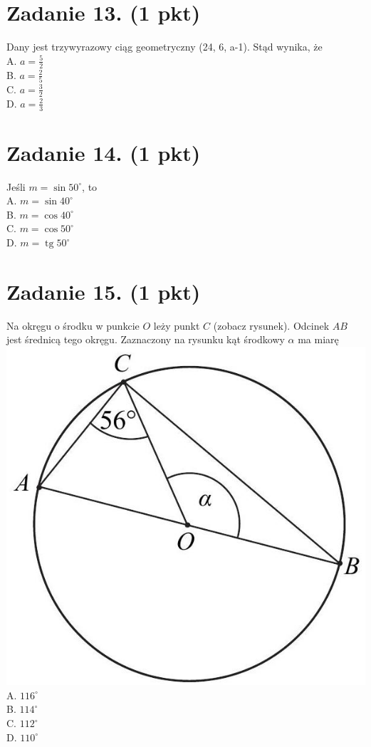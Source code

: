 \documentclass[10pt]{article}
\begin{document}
\section*{Zadanie 13. (1 pkt)}
Dany jest trzywyrazowy ciąg geometryczny (24, 6, a-1). Stąd wynika, że\\
A. \(a=\frac{5}{2}\)\\
B. \(a=\frac{2}{5}\)\\
C. \(a=\frac{3}{2}\)\\
D. \(a=\frac{2}{3}\)

\section*{Zadanie 14. (1 pkt)}
Jeśli \(m=\sin 50^{\circ}\), to\\
A. \(m=\sin 40^{\circ}\)\\
B. \(m=\cos 40^{\circ}\)\\
C. \(m=\cos 50^{\circ}\)\\
D. \(m=\operatorname{tg} 50^{\circ}\)

\section*{Zadanie 15. (1 pkt)}
Na okręgu o środku w punkcie \(O\) leży punkt \(C\) (zobacz rysunek). Odcinek \(A B\) jest średnicą tego okręgu. Zaznaczony na rysunku kąt środkowy \(\alpha\) ma miarę\\
\includegraphics[max width=\textwidth, center]{2024_11_21_ad8c43efe74fa059d24eg-08}\\
A. \(116^{\circ}\)\\
B. \(114^{\circ}\)\\
C. \(112^{\circ}\)\\
D. \(110^{\circ}\)
\end{document}
